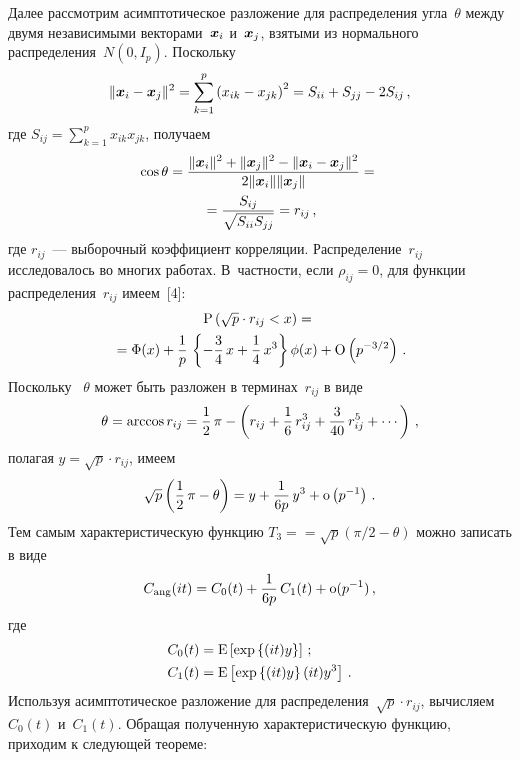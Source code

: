 \begin{multicols}{2}
Далее рассмотрим асимптотическое разложение для распределения угла~$\theta$ между двумя независимыми 
векторами~$\mbox{\boldmath{$x$}}_i$ и~$\mbox{\boldmath{$x$}}_j$, взятыми из нормального распределения~$N(0,I_p)$.
Поскольку
$$
\|\mbox{\boldmath{$x$}}_i - \mbox{\boldmath{$x$}}_j\|^2 = \sum\limits^{p}_{k = 1} \left(x_{ik} - x_{jk} \right)^2 = S_{ii} +S_{jj} -2 S_{ij}\,,
$$
где  $S_{ij} = \sum\limits^{p}_{k=1} x_{ik} x_{jk}$, получаем
\begin{multline*}
\cos \theta = \displaystyle\frac{\displaystyle \|\mbox{\boldmath{$x$}}_i\|^2+\|\mbox{\boldmath{$x$}}_j\|^2 - \|\mbox{\boldmath{$x$}}_i -\mbox{\boldmath{$x$}}_j\|^2\mathstrut}{\displaystyle 2 \|\mbox{\boldmath{$x$}}_i\|\|\mbox{\boldmath{$x$}}_j\|\mathstrut}={}\\
{} =\displaystyle\frac{\displaystyle S_{ij}\mathstrut}{\displaystyle \sqrt{S_{ii}S_{jj}}\mathstrut}
                = r_{ij} \,,
\end{multline*}
где $r_{ij}$~--- выборочный коэффициент корреляции. Распределение~$r_{ij}$ исследовалось во многих работах. 
В~частности, если  $\rho_{ij} = 0$, для функции распределения~$r_{ij}$ имеем~[4]:
\begin{multline*}
\mbox{\rm P}\left (\sqrt{p}\cdot r_{ij} < x\right)={}\\
{}= \mbox{$\Phi$}(x) +\displaystyle\frac{\displaystyle 1\mathstrut}{\displaystyle p\mathstrut}\, \left \{- \displaystyle\frac{\displaystyle 3\mathstrut}{\displaystyle 4\mathstrut}\,x
+\displaystyle\frac{\displaystyle 1\mathstrut}{\displaystyle 4\mathstrut}\,x^3\right\} \mbox{$\phi$}(x) 
+ \mbox{\rm O}\left(p^{-3/2}\right)\,.
\end{multline*}
Поскольку~ $\theta$ может быть разложен в терминах~$r_{ij}$ в виде
\begin{equation*}
\theta = \arccos r_{ij}
       = \displaystyle\frac{\displaystyle 1\mathstrut}{\displaystyle 2\mathstrut}\,\pi - \left(r_{ij} + \displaystyle\frac{\displaystyle 1\mathstrut}{\displaystyle 6\mathstrut}\,r_{ij}^3 + \displaystyle\frac{\displaystyle 3\mathstrut}{\displaystyle 40\mathstrut}\, r_{ij}^5 + \cdots\right)\,,
\end{equation*}
полагая   $y = \sqrt{p}\cdot r_{ij}$, имеем
\begin{equation*}
\sqrt p \left( \displaystyle\frac{\displaystyle 1\mathstrut}{\displaystyle 2\mathstrut}\,\pi - \theta \right) =  y + \displaystyle\frac{\displaystyle 1\mathstrut}{\displaystyle 6p\mathstrut}\,y^3 + \mbox{\rm o}\left(p^{-1}\right)\,.
\end{equation*}
Тем самым характеристическую функцию $T_3 =$\linebreak $= \sqrt {p} \left(\pi/2 - \theta \right)$ можно записать в виде
\begin{equation*}
C_{\mathrm{ang}}(it) = C_0(t) +\displaystyle\frac{\displaystyle 1\mathstrut}{\displaystyle 6p\mathstrut}\,C_1(t) + \mbox{\rm o}(p^{-1})\,,
\end{equation*}
где
\begin{align*}
C_0(t) &= \mbox{\rm E} \left[\exp\left\{(it) y\right\}\right ]\,;\\
C_1(t) &= \mbox{\rm E} \left[\exp\left\{(it) y\right\}(it)y^3\right ]\,.
\end{align*}
Используя асимптотическое разложение для распределения~$\sqrt{p}\cdot r_{ij}$,
вычисляем~$C_0(t)$ и~$C_1(t)$. Обращая полученную характеристическую функцию, приходим к следующей теореме:

\smallskip


\end{multicols}
